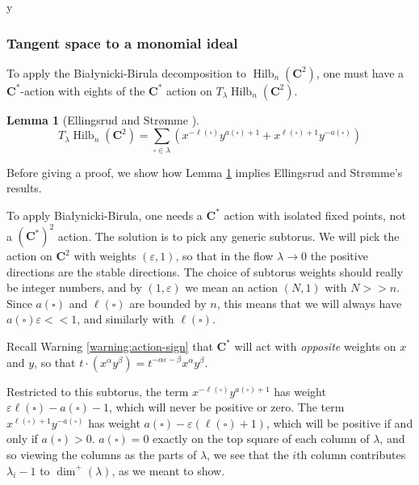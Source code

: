 y\documentclass{amsart}[12pt]
\theoremstyle{definition}
\newtheorem{lemma}[dummy]{Lemma}
\newcommand{\C}{\mathbf{C}}
\DeclareMathOperator{\Hilb}{Hilb}
\begin{document}
\subsubsection{Tangent space to a monomial ideal}
To apply the Bia\l ynicki-Birula decomposition to $\Hilb_n(\C^2)$, one must have a $\C^*$-action with eights of the $\C^*$ action on $T_\lambda\Hilb_n(\C^2)$.

\begin{lemma}[Ellingsrud and Str\o mme \cite{ES}] \label{lem:torus-weights}
$$T_\lambda \Hilb_n(\C^2)=\sum_{\square\in\lambda} \left(x^{-\ell(\square)} y^{a(\square)+1}+x^{\ell(\square)+1}y^{-a(\square)}\right)$$
\end{lemma}

Before giving a proof, we show how Lemma \ref{lem:torus-weights} implies Ellingsrud and Str\o mme's results. 

To apply Bia\l ynicki-Birula, one needs a $\C^*$ action with isolated fixed points, not a $(\C^*)^2$ action.  The solution is to pick any generic subtorus.  We will pick the action on $\C^2$ with weights $(\varepsilon,1)$, so that in the flow $\lambda\to 0$ the positive directions are the stable directions.  The choice of subtorus weights should really be integer numbers, and by $(1,\varepsilon)$ we mean an action $(N,1)$ with $N>>n$. Since $a(\square)$ and $\ell(\square)$ are bounded by $n$, this means that we will always have $a(\square)\varepsilon<<1$, and similarly with $\ell(\square)$.

Recall Warning \ref{warning:action-sign} that $\C^*$ will act with \emph{opposite} weights on $x$ and $y$, so that $t\cdot(x^\alpha y^\beta)=t^{-\alpha\varepsilon-\beta}x^\alpha y^\beta$.  

Restricted to this subtorus, the term $x^{-\ell(\square)} y^{a(\square)+1}$ has weight $\varepsilon\ell(\square)-a(\square)-1$, which will never be positive or zero.  The term $x^{\ell(\square)+1}y^{-a(\square)}$ has weight $a(\square)-\varepsilon(\ell(\square)+1)$, which will be positive if and only if $a(\square)>0$.  $a(\square)=0$ exactly on the top square of each column of $\lambda$, and so viewing the columns as the parts of $\lambda$, we see that the $i$th column contributes $\lambda_i-1$ to $\dim^+(\lambda)$, as we meant to show.



\begin{center}
\end{center}
\end{document}
